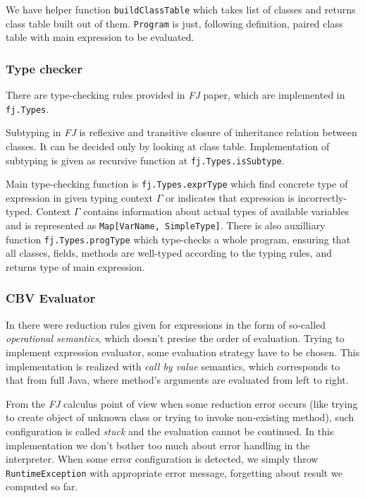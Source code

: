 \documentclass{article}[12pt]
\begin{document}
We have helper function \texttt{buildClassTable} which takes list
of classes and returns class table built out of them.
\texttt{Program} is just, following definition, paired class table
with main expression to be evaluated.

\subsubsection{Type checker}

There are type-checking rules provided in \emph{FJ} paper, which
are implemented in \texttt{fj.Types}.

Subtyping in \emph{FJ} is reflexive and transitive closure of
inheritance relation between classes. It can be decided only by
looking at class table. Implementation of subtyping is given as
recursive function at \texttt{fj.Types.isSubtype}.

Main type-checking function is \texttt{fj.Types.exprType} which
find concrete type of expression in given typing context $\Gamma$
or indicates that expression is incorrectly-typed. Context
$\Gamma$ contains information about actual types of available
variables and is represented as \texttt{Map[VarName, SimpleType]}.
There is also auxilliary function \texttt{fj.Types.progType} which
type-checks a whole program, ensuring that all classes, fields,
methods are well-typed according to the typing rules, and returns
type of main expression.

\subsubsection{CBV Evaluator}

In \cite{fj} there were reduction rules given for expressions in
the form of so-called \emph{operational semantics}, which doesn't
precise the order of evaluation. Trying to implement expression
evaluator, some evaluation strategy have to be chosen. This
implementation is realized with \emph{call by value} semantics,
which corresponds to that from full Java, where method's arguments
are evaluated from left to right.

From the \emph{FJ} calculus point of view when some reduction error
occurs (like trying to create object of unknown class or trying to
invoke non-existing method), such configuration is called \emph{stuck}
and the evaluation cannot be continued. In this implementation we
don't bother too much about error handling in the interpreter.
When some error configuration is detected, we simply throw
\texttt{RuntimeException} with appropriate error message, forgetting
about result we computed so far.
\end{document}
